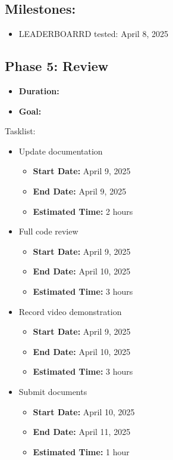 \documentclass{report}
\begin{document}
\subsection*{Milestones:}
\begin{itemize}
    \item LEADERBOARRD tested: April 8, 2025
\end{itemize}
\subsection*{Phase 5: Review}
\begin{itemize}
    \item \textbf{Duration:} 
    \item \textbf{Goal:} 
\end{itemize}
Tasklist:
\begin{itemize}
    \item Update documentation
    \begin{itemize}
        \item \textbf{Start Date:} April 9, 2025
        \item \textbf{End Date:} April 9, 2025
        \item \textbf{Estimated Time:} 2 hours
    \end{itemize}
    \item Full code review
    \begin{itemize}
        \item \textbf{Start Date:} April 9, 2025
        \item \textbf{End Date:} April 10, 2025
        \item \textbf{Estimated Time:} 3 hours
    \end{itemize}
    \item Record video demonstration
    \begin{itemize}
        \item \textbf{Start Date:} April 9, 2025
        \item \textbf{End Date:} April 10, 2025
        \item \textbf{Estimated Time:} 3 hours
    \end{itemize}
    \item Submit documents
    \begin{itemize}
        \item \textbf{Start Date:} April 10, 2025
        \item \textbf{End Date:} April 11, 2025
        \item \textbf{Estimated Time:} 1 hour
    \end{itemize}


\end{itemize}
\end{document}
